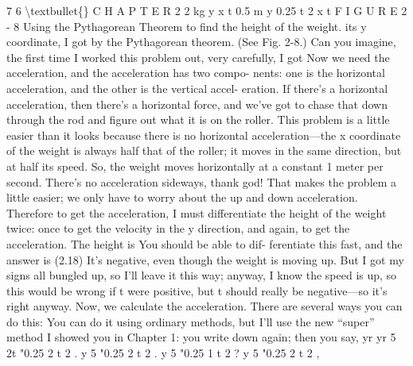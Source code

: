 \documentclass[10pt,oneside]{article}
\begin{document}
7 6 \textbackslash{}textbullet\{\} C H A P T E R  2 2 kg y x t 0.5 m y     0.25  t 2 x  t F I G U R E 2 - 8 Using the Pythagorean Theorem to find the height of the weight. its y coordinate, I got by the Pythagorean theorem. (See Fig. 2-8.) Can you imagine, the first time I worked this problem out, very carefully, I got Now we need the acceleration, and the acceleration has two compo- nents: one is the horizontal acceleration, and the other is the vertical accel- eration. If there’s a horizontal acceleration, then there’s a horizontal force, and we’ve got to chase that down through the rod and figure out what it is on the roller. This problem is a little easier than it looks because there is no horizontal acceleration---the x coordinate of the weight is always half that of the roller; it moves in the same direction, but at half its speed. So, the weight moves horizontally at a constant 1 meter per second. There’s no acceleration sideways, thank god! That makes the problem a little easier; we only have to worry about the up and down acceleration. Therefore to get the acceleration, I must differentiate the height of the weight twice: once to get the velocity in the y direction, and again, to get the acceleration. The height is You should be able to dif- ferentiate this fast, and the answer is (2.18) It’s negative, even though the weight is moving up. But I got my signs all bungled up, so I’ll leave it this way; anyway, I know the speed is up, so this would be wrong if t were positive, but t should really be negative---so it’s right anyway. Now, we calculate the acceleration. There are several ways you can do this: You can do it using ordinary methods, but I’ll use the new “super” method I showed you in Chapter 1: you write down again; then you say, yr yr 5 2t "0.25 2 t 2 . y 5 "0.25 2 t 2 . y 5 "0.25 1 t 2 ? y 5 "0.25 2 t 2 ,\par
\end{document}
